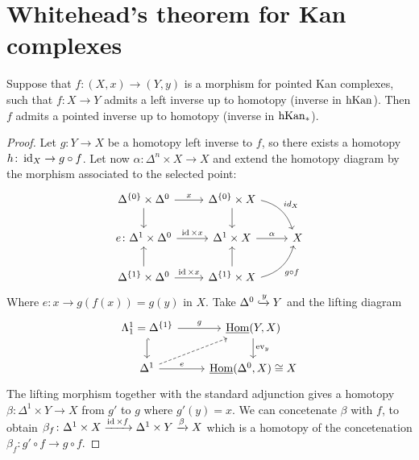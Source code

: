 \section{Whitehead's theorem for Kan complexes}

\begin{lem}
\label{homotopy inverses are pointed homotopy inverses}
    Suppose that $f\colon (X,x) \to (Y,y)$ is a morphism for pointed Kan complexes, such that $f\colon X \to Y$ admits a left inverse up to homotopy (inverse in $\operatorname{hKan}$).
    Then $f$ admits a pointed inverse up to homotopy (inverse in $\operatorname{hKan}_*$).
\end{lem}

\begin{proof}
    Let $g\colon Y \to X$ be a homotopy left inverse to $f$, so there exists a homotopy $h\colon \operatorname{id}_X \to g\circ f$.
    Let now $\alpha \colon \Delta^n \times X \to X$ and extend the homotopy diagram by the morphism associated to the selected point:
    \[
    \begin{tikzcd}
        \Delta^{\{0\}} \times \Delta^0
        \ar[r, "x"]
        \ar[d]
        &
        \Delta^{\{0\}} \times X
        \ar[d]
        \ar[rd, bend left, "id_X"]
        \\
        e\colon\Delta^1 \times \Delta^0
        \ar[r, "\id \times x"]
        &
        \Delta^1 \times X
        \ar[r, "\alpha"]
        &
        X
        \\
        \Delta^{\{1\}} \times \Delta^0
        \ar[u]
        \ar[r, "\id \times x"]
        &
        \Delta^{\{1\}} \times X
        \ar[u]
        \ar[ru, bend right, "g \circ f"']
    \end{tikzcd}
    \]
    Where $e\colon x \to g(f(x))=g(y)$ in $X$.
    Take $\Delta^0 \xhookrightarrow{y} Y$ and the lifting diagram
    \[
    \begin{tikzcd}
        \Lambda^1_1= \Delta^{\{1\}}
        \ar[r, "g"]
        \ar[d, hook]
        &
        \underline{\Hom}(Y,X)
        \ar[d, "\ev_y"]
        \\
        \Delta^1
        \ar[ru, dashed]
        \ar[r, "e"]
        &
        \underline{\Hom}(\Delta^0,X) \cong X
    \end{tikzcd}
    \]
    The lifting morphism together with the standard adjunction gives a homotopy $\beta \colon \Delta^1 \times Y \to  X$ from $g'$ to $g$ where $g'(y)=x$.
    We can concetenate $\beta$ with $f$, to obtain $\beta_f \colon \Delta^1 \times X \xrightarrow{\operatorname{id} \times f} \Delta^1 \times Y \xrightarrow{ \beta}X$ which is a homotopy of the concetenation $\beta_f \colon g' \circ f \to g \circ f$.

\end{proof}
